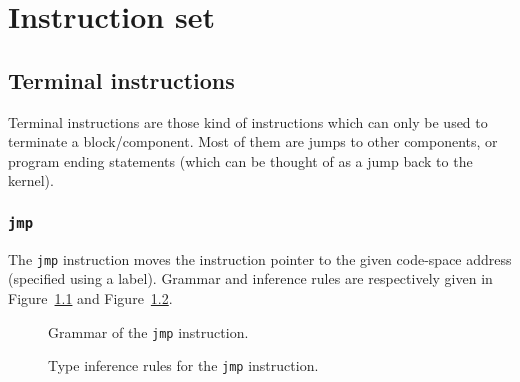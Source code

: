 \chapter{Instruction set}\label{chap:nstar-instructionset}

\section{Terminal instructions}\label{sec:nstar-instructionset-terminal}

Terminal instructions are those kind of instructions which can only be used to terminate a block/component.
Most of them are jumps to other components, or program ending statements (which can be thought of as a jump back to the kernel).

\subsection{\texttt{jmp}}\label{subsec:nstar-instructionset-teminal-jmp}

The \texttt{jmp} instruction moves the instruction pointer to the given code-space address (specified using a label).
Grammar and inference rules are respectively given in Figure~\ref{fig:nstar-instructionset-terminal-jmp-grammar} and Figure~\ref{fig:nstar-instructionset-terminal-jmp-typerules}.

\begin{figure}[H]
  \centering


  \caption{Grammar of the \texttt{jmp} instruction.}
  \label{fig:nstar-instructionset-terminal-jmp-grammar}
\end{figure}

\begin{figure}[H]
  \centering


  \caption{Type inference rules for the \texttt{jmp} instruction.}
  \label{fig:nstar-instructionset-terminal-jmp-typerules}
\end{figure}

